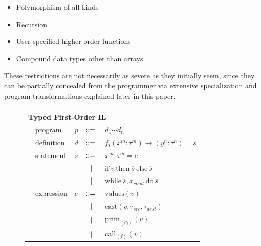 \documentclass[preprint]{sigplanconf}
\begin{document}
\begin{itemize}
\item Polymorphism of all kinds
\item Recursion
\item User-specified higher-order functions
\item Compound data types other than arrays
\end{itemize}

These restrictions are not necessarily as severe as they initially seem, since they can be partially concealed from the programmer via extensive specialization and program transformations explained later in this paper.


\begin{figure}[h!]
  \begin{tabular}{| m{0.01cm}m{1.3cm}m{0.1cm}m{0.2cm}p{5.0cm} |}
  \hline
    & & & &\\
   \multicolumn{5}{|l|}{\textbf{Typed First-Order IL}}  \\[4pt]
  & program & $p$ &  $::=$   &  $d_1 \cdots d_n $ \\[4pt]
  & definition & $d$ & $::=$ & $f_i(x^m : \tau^m) \rightarrow (y^n : \tau^n) = \overline{s} $ \\[4pt]
  & statement  & $s$ & $::=$ & $x^m : \tau^m = e $\\[2pt]
  &            &     & $\ \ | \ \ $    & $\mathrm{if} ~v~ \mathrm{then} ~\overline{s}~ \mathrm{else} ~ \overline{s}$ \\[2pt]
  &            &     & $\ \ | \ \ $    & $\mathrm{while} ~ \overline{s}, x_{cond} ~ \mathrm{do} ~ \overline{s} ~  $ \\[4pt]
  & expression & $e$ & $::=$ & $\mathrm{values}(\overline{v})$ \\[2pt]
  &            &     & $\ \ | \ \ $    & $\mathrm{cast} (v, \tau_{src}, \tau_{dest})$ \\[2pt]
  &            &     & $\ \ | \ \ $    & $\mathrm{prim}_{\left\langle \oplus \right\rangle }(\overline{v})$ \\[2pt]
  &            &     & $\ \ | \ \ $    & $\mathrm{call}_{\left\langle f  \right\rangle } (\overline{v})$ \\[2pt] 
  

\end{tabular}
\end{figure}
\end{document}
